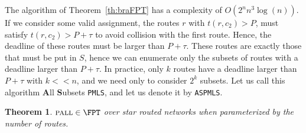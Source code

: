 \documentclass[a4paper,10pt]{article}
\newcommand\PMLS{\texttt{PMLS}\xspace}
\newcommand\ASPMLS{\texttt{ASPMLS}\xspace}
\newtheorem{theorem}{Theorem}
\newcommand\pall{\textsc{pall}\xspace}
\begin{document}
The algorithm of Theorem~\ref{th:braFPT} has a complexity of $O(2^nn^3\log(n))$. If we consider some valid assignment, the routes $r$ with $t(r,c_2) > P$, must satisfy $t(r,c_2) > P + \tau$ to avoid collision with the first route. Hence, the deadline of these routes must be larger than $P + \tau$. These routes are exactly those that must be put in $S$, hence we can enumerate only the subsets of routes with a deadline larger than $P + \tau$. In practice, only $k$ routes have a deadline larger than $P + \tau$ with $k << n$, and we need only to consider $2^k$ subsets. Let us call this algorithm \textbf{A}ll \textbf{S}ubsets \PMLS, and let us denote it by \ASPMLS.


\begin{theorem}\label{th:pallFPT}
$\pall \in \FPT$ over star routed networks when parameterized by the number of routes.
\end{theorem}
\end{document}
